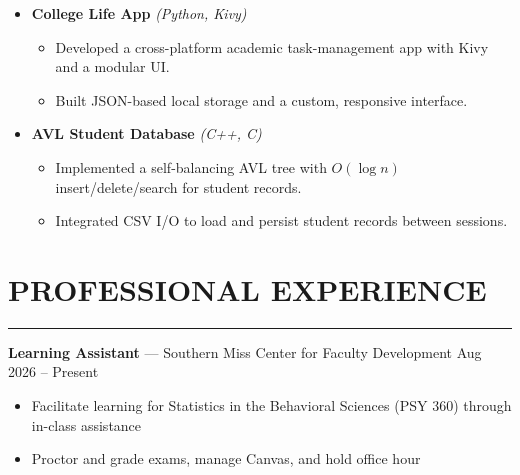 \documentclass[10pt, letterpaper]{article}
\newcommand{\ghlink}[1]{\href{#1}{\color{bluecolor}\faIcon{github}}}
\begin{document}
\begin{minipage}[t]{0.72\textwidth}
\begin{itemize}[label=\raisebox{0.25ex}{\rule{0.65ex}{0.65ex}}]
    \vspace{7pt}

    \item \textbf{College Life App} \textit{(Python, Kivy)} \hfill
        \ghlink{https://github.com/MdSafwanBinRashid/College_Life_App_KivyPy}
    \begin{itemize}[label=--, nosep]
        \item Developed a cross-platform academic task-management app with Kivy and a modular UI.
        \item Built JSON-based local storage and a custom, responsive interface.
    \end{itemize}

    \vspace{7pt}

    \item \textbf{AVL Student Database} \textit{(C++, C)} \hfill
        \ghlink{https://github.com/MdSafwanBinRashid/AVLStudentDB}
    \begin{itemize}[label=--, nosep]
        \item Implemented a self-balancing AVL tree with \(O(\log n)\) insert/delete/search for student records.
        \item Integrated CSV I/O to load and persist student records between sessions.
    \end{itemize}

\end{itemize}

\vspace{4pt}

\section*{PROFESSIONAL EXPERIENCE}\vspace{-2pt}\hrule\vspace{6pt}

\textbf{Learning Assistant} --- Southern Miss Center for Faculty Development \hfill Aug 2026 -- Present
\begin{itemize}[label=--, nosep]
    \item Facilitate learning for Statistics in the Behavioral Sciences (PSY 360) through in-class assistance
    \item Proctor and grade exams, manage Canvas, and hold office hour
\end{itemize}

\vspace{7pt}


\end{minipage}
\end{document}
